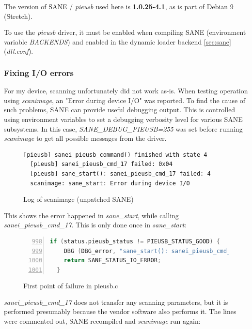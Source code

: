 \documentclass{article}
\begin{document}
The version of SANE / {\it pieusb} used here is {\bf 1.0.25-4.1}, as is part of
Debian 9 (Stretch).

To use the {\it pieusb} driver, it must be enabled when compiling SANE
(environment variable {\it BACKENDS}) and enabled in the dynamic loader backend
\ref{sec:sane} ({\it dll.conf}).

\subsubsection{Fixing I/O errors}

For my device, scanning unfortunately did not work as-is. When testing operation
using {\it scanimage}, an "Error during device I/O" was reported. To find the
cause of such problems, SANE can provide useful debugging output. This is controlled
using environment variables to set a debugging verbosity level for various SANE
subsystems. In this case, {\it SANE\_DEBUG\_PIEUSB=255} was set before running
{\it scanimage} to get all possible messages from the driver.

\begin{figure}[H]
  \begin{lstlisting}[language={}]
  [pieusb] sanei_pieusb_command() finished with state 4
  [pieusb] sanei_pieusb_cmd_17 failed: 0x04
  [pieusb] sane_start(): sanei_pieusb_cmd_17 failed: 4
  scanimage: sane_start: Error during device I/O
  \end{lstlisting}
  
  \caption{Log of scanimage (unpatched SANE)}
\end{figure}

This shows the error happened in {\it sane\_start}, while calling {\it sanei\_pieusb\_cmd\_17}.
This is only done once in {\it sane\_start}:

\begin{figure}[H]
  \begin{lstlisting}[language=C, breaklines=true, numbers=left, firstnumber=998]
  if (status.pieusb_status != PIEUSB_STATUS_GOOD) {
    DBG (DBG_error, "sane_start(): sanei_pieusb_cmd_17 failed: %d\n", status.pieusb_status);
    return SANE_STATUS_IO_ERROR;
  }
  \end{lstlisting}
  \caption{First point of failure in pieusb.c}
\end{figure}

{\it sanei\_pieusb\_cmd\_17} does not transfer any scanning parameters, but it is
performed presumably because the vendor software also performs it. The lines
were commented out, SANE recompiled and {\it scanimage} run again:
\end{document}
